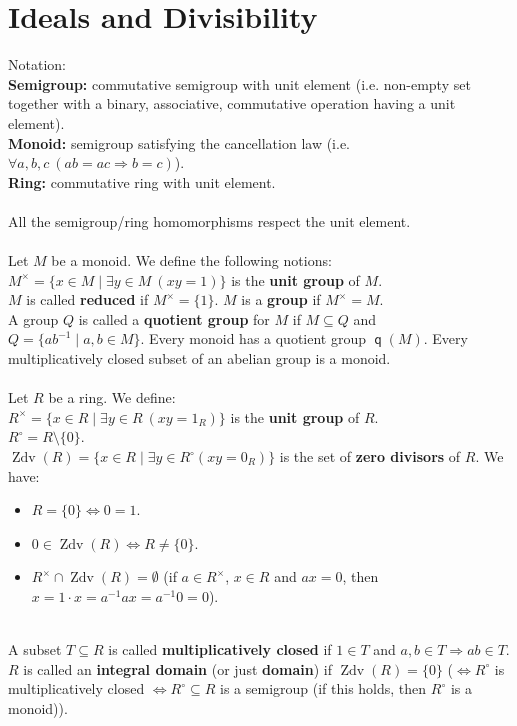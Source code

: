 \documentclass[12pt,a4paper]{report}
\theoremstyle{definition}
\theoremstyle{num.custom-title}
\DeclareMathOperator{\Zdv}{Zdv}
\DeclareMathOperator{\imp}{\Rightarrow}
\DeclareMathOperator{\sm}{\setminus}
\DeclareMathOperator{\sse}{\subseteq}
\DeclareMathOperator{\q}{\mathsf{q}}
\newcommand{\IFF}{\Longleftrightarrow}
\begin{document}
\chapter{Ideals and Divisibility}

Notation:\\
\textbf{Semigroup:} commutative semigroup with unit element (i.e. non-empty set together with a binary, associative, commutative operation having a unit element).\\
\textbf{Monoid:} semigroup satisfying the cancellation law (i.e. $\forall a,b,c \ (ab=ac \imp b=c)$).\\
\textbf{Ring:} commutative ring with unit element.\\
\\
All the semigroup/ring homomorphisms respect the unit element.\\
\\
Let $M$ be a monoid. We define the following notions:\\
$M^\times= \{x \in M \mid \exists y \in M \ (xy=1)\}$ is the \textbf{unit group} of $M$.\\
$M$ is called \textbf{reduced} if $M^\times=\{1\}$. $M$ is a \textbf{group} if $M^\times=M$.\\
A group $Q$ is called a \textbf{quotient group} for $M$ if $M \sse Q$ and $Q=\{ab^{-1} \mid a,b \in M\}$. Every monoid has a quotient group $\q(M)$. Every multiplicatively closed subset of an abelian group is a monoid.\\
\\
Let $R$ be a ring. We define:\\
$R^\times=\{x \in R \mid \exists y \in R \ (xy=1_R)\}$ is the \textbf{unit group} of $R$.\\
$R^\circ=R \sm \{0\}$.\\
$\Zdv(R)=\{x \in R \mid \exists y \in R^\circ (xy=0_R)\}$ is the set of \textbf{zero divisors} of $R$.
We have:
\begin{itemize}
\item $R=\{0\} \IFF 0=1$.
\item $0 \in \Zdv(R) \IFF R \neq \{0\}$.
\item $R^\times \cap \Zdv(R) = \emptyset$ (if $a \in R^\times$, $x \in R$ and $ax=0$, then $x=1 \cdot x = a^{-1} a x = a^{-1} 0 = 0$).
\end{itemize}
\ \\
A subset $T \sse R$ is called \textbf{multiplicatively closed} if $1 \in T$ and $a,b \in T \imp ab \in T$.\\
$R$ is called an \textbf{integral domain} (or just \textbf{domain}) if $\Zdv(R)=\{0\}$ ($\IFF R^\circ$ is multiplicatively closed $\IFF R^\circ \sse R$ is a semigroup (if this holds, then $R^\circ$ is a monoid)).\\
\end{document}
